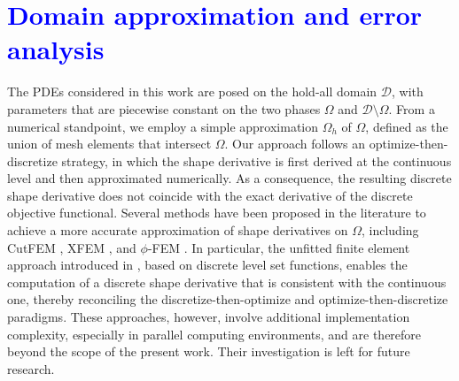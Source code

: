 \documentclass[preprint,9pt]{elsarticle}
\newcommand{\blue}{\textcolor{blue}}
\begin{document}
\section{\blue{Domain approximation and error analysis}}\label{sec:error}

The PDEs considered in this work are posed on the hold-all domain
$\mathcal{D}$, with parameters that are piecewise constant on the two
phases $\Omega$ and $\mathcal{D} \setminus \Omega$.
From a numerical standpoint, we employ a simple approximation $\Omega_h$
of $\Omega$, defined as the union of mesh elements that intersect
$\Omega$.
Our approach follows an optimize-then-discretize strategy, in which the
shape derivative is first derived at the continuous level and then
approximated numerically. As a consequence, the resulting discrete shape
derivative does not coincide with the exact derivative of the discrete
objective functional.
Several methods have been proposed in the literature to achieve a more
accurate approximation of shape derivatives on $\Omega$, including
CutFEM \citep{MR3416285}, XFEM \citep{belytschko2001arbitrary}, and
$\phi$-FEM \cite{Duprez1}. In particular, the unfitted finite element
approach introduced in \cite{ShahanWalker}, based on discrete level set
functions, enables the computation of a discrete shape derivative that
is consistent with the continuous one, thereby reconciling the
discretize-then-optimize and optimize-then-discretize paradigms.
These approaches, however, involve additional implementation complexity,
especially in parallel computing environments, and are therefore beyond
the scope of the present work. Their investigation is left for future
research.
\end{document}
